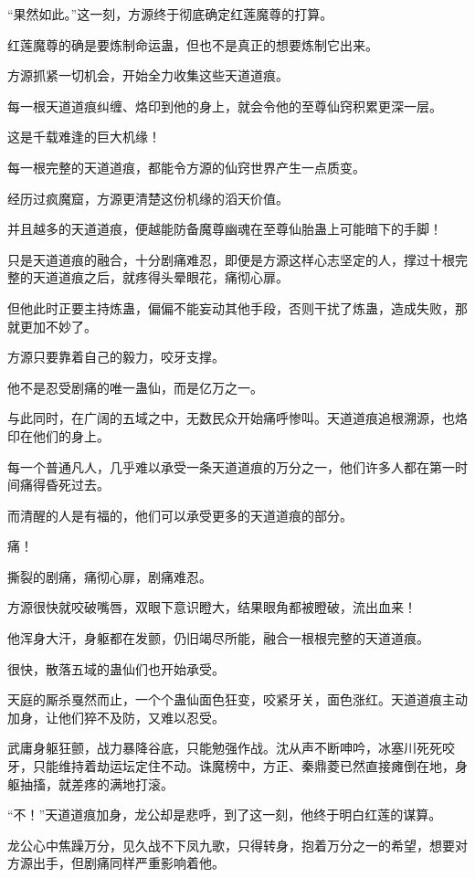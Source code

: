 \begin{this_body}
“果然如此。”这一刻，方源终于彻底确定红莲魔尊的打算。

红莲魔尊的确是要炼制命运蛊，但也不是真正的想要炼制它出来。

方源抓紧一切机会，开始全力收集这些天道道痕。

每一根天道道痕纠缠、烙印到他的身上，就会令他的至尊仙窍积累更深一层。

这是千载难逢的巨大机缘！

每一根完整的天道道痕，都能令方源的仙窍世界产生一点质变。

经历过疯魔窟，方源更清楚这份机缘的滔天价值。

并且越多的天道道痕，便越能防备魔尊幽魂在至尊仙胎蛊上可能暗下的手脚！

只是天道道痕的融合，十分剧痛难忍，即便是方源这样心志坚定的人，撑过十根完整的天道道痕之后，就疼得头晕眼花，痛彻心扉。

但他此时正要主持炼蛊，偏偏不能妄动其他手段，否则干扰了炼蛊，造成失败，那就更加不妙了。

方源只要靠着自己的毅力，咬牙支撑。

他不是忍受剧痛的唯一蛊仙，而是亿万之一。

与此同时，在广阔的五域之中，无数民众开始痛呼惨叫。天道道痕追根溯源，也烙印在他们的身上。

每一个普通凡人，几乎难以承受一条天道道痕的万分之一，他们许多人都在第一时间痛得昏死过去。

而清醒的人是有福的，他们可以承受更多的天道道痕的部分。

痛！

撕裂的剧痛，痛彻心扉，剧痛难忍。

方源很快就咬破嘴唇，双眼下意识瞪大，结果眼角都被瞪破，流出血来！

他浑身大汗，身躯都在发颤，仍旧竭尽所能，融合一根根完整的天道道痕。

很快，散落五域的蛊仙们也开始承受。

天庭的厮杀戛然而止，一个个蛊仙面色狂变，咬紧牙关，面色涨红。天道道痕主动加身，让他们猝不及防，又难以忍受。

武庸身躯狂颤，战力暴降谷底，只能勉强作战。沈从声不断呻吟，冰塞川死死咬牙，只能维持着劫运坛定住不动。诛魔榜中，方正、秦鼎菱已然直接瘫倒在地，身躯抽搐，就差疼的满地打滚。

“不！”天道道痕加身，龙公却是悲呼，到了这一刻，他终于明白红莲的谋算。

龙公心中焦躁万分，见久战不下凤九歌，只得转身，抱着万分之一的希望，想要对方源出手，但剧痛同样严重影响着他。


\end{this_body}
